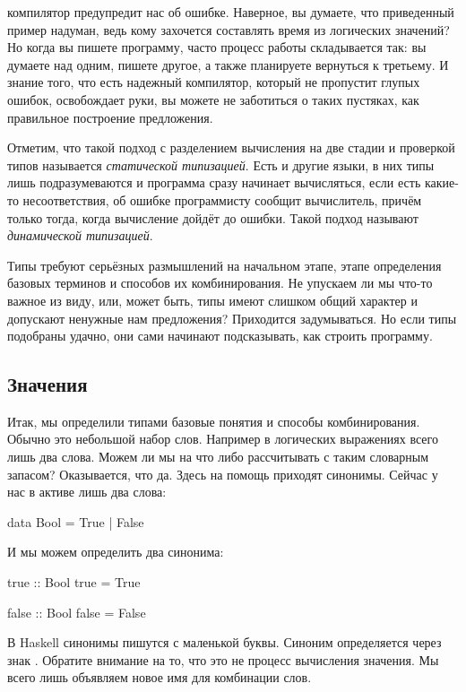 \noindent компилятор предупредит нас об ошибке. Наверное, вы 
думаете, что приведенный пример надуман, ведь кому 
захочется составлять время из логических значений? Но когда 
вы пишете программу, часто процесс работы складывается так:
вы думаете над одним, пишете другое, а также планируете вернуться
к третьему. И знание того, что есть надежный компилятор, который
не пропустит глупых ошибок, освобождает руки, вы можете не 
заботиться о таких пустяках, как правильное построение предложения. 

Отметим, что такой подход с разделением вычисления на
две стадии и проверкой типов называется 
\emph{статической типизацией}.
Есть и другие языки, в них типы лишь подразумеваются 
и программа сразу начинает вычисляться, если есть какие-то
несоответствия, об ошибке программисту сообщит вычислитель,
причём только тогда, когда вычисление дойдёт до ошибки.
Такой подход называют \emph{динамической типизацией}.

Типы требуют серьёзных размышлений на начальном этапе, этапе определения
базовых терминов и способов их комбинирования. Не упускаем ли
мы что-то важное из виду, или, может быть, типы имеют слишком 
общий характер и допускают ненужные нам предложения? Приходится 
задумываться. Но если типы подобраны удачно, они сами
начинают подсказывать, как строить программу.

\subsection{Значения}

Итак, мы определили типами базовые понятия и способы комбинирования.
Обычно это небольшой набор слов. Например в логических выражениях
всего лишь два слова. Можем ли мы на что либо рассчитывать с 
таким словарным запасом? Оказывается, что да. Здесь на помощь приходят синонимы. Сейчас у нас в активе лишь два слова:

\begin{code}
data Bool = True | False
\end{code}

И мы можем определить два синонима:

\begin{code}
true :: Bool
true = True

false :: Bool
false = False
\end{code}

В Haskell синонимы пишутся с маленькой буквы. Синоним 
определяется через знак \In{=}. Обратите внимание на то, что
это не процесс вычисления значения. Мы всего лишь объявляем 
новое имя для комбинации слов. 

